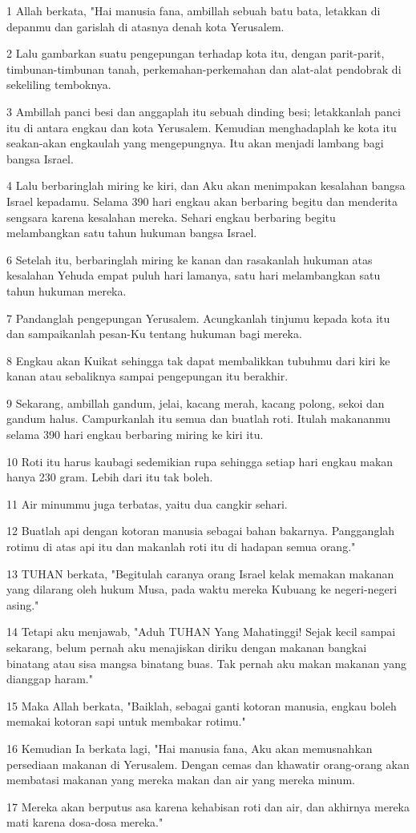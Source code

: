 \par 1 Allah berkata, "Hai manusia fana, ambillah sebuah batu bata, letakkan di depanmu dan garislah di atasnya denah kota Yerusalem.
\par 2 Lalu gambarkan suatu pengepungan terhadap kota itu, dengan parit-parit, timbunan-timbunan tanah, perkemahan-perkemahan dan alat-alat pendobrak di sekeliling temboknya.
\par 3 Ambillah panci besi dan anggaplah itu sebuah dinding besi; letakkanlah panci itu di antara engkau dan kota Yerusalem. Kemudian menghadaplah ke kota itu seakan-akan engkaulah yang mengepungnya. Itu akan menjadi lambang bagi bangsa Israel.
\par 4 Lalu berbaringlah miring ke kiri, dan Aku akan menimpakan kesalahan bangsa Israel kepadamu. Selama 390 hari engkau akan berbaring begitu dan menderita sengsara karena kesalahan mereka. Sehari engkau berbaring begitu melambangkan satu tahun hukuman bangsa Israel.
\par 6 Setelah itu, berbaringlah miring ke kanan dan rasakanlah hukuman atas kesalahan Yehuda empat puluh hari lamanya, satu hari melambangkan satu tahun hukuman mereka.
\par 7 Pandanglah pengepungan Yerusalem. Acungkanlah tinjumu kepada kota itu dan sampaikanlah pesan-Ku tentang hukuman bagi mereka.
\par 8 Engkau akan Kuikat sehingga tak dapat membalikkan tubuhmu dari kiri ke kanan atau sebaliknya sampai pengepungan itu berakhir.
\par 9 Sekarang, ambillah gandum, jelai, kacang merah, kacang polong, sekoi dan gandum halus. Campurkanlah itu semua dan buatlah roti. Itulah makananmu selama 390 hari engkau berbaring miring ke kiri itu.
\par 10 Roti itu harus kaubagi sedemikian rupa sehingga setiap hari engkau makan hanya 230 gram. Lebih dari itu tak boleh.
\par 11 Air minummu juga terbatas, yaitu dua cangkir sehari.
\par 12 Buatlah api dengan kotoran manusia sebagai bahan bakarnya. Pangganglah rotimu di atas api itu dan makanlah roti itu di hadapan semua orang."
\par 13 TUHAN berkata, "Begitulah caranya orang Israel kelak memakan makanan yang dilarang oleh hukum Musa, pada waktu mereka Kubuang ke negeri-negeri asing."
\par 14 Tetapi aku menjawab, "Aduh TUHAN Yang Mahatinggi! Sejak kecil sampai sekarang, belum pernah aku menajiskan diriku dengan makanan bangkai binatang atau sisa mangsa binatang buas. Tak pernah aku makan makanan yang dianggap haram."
\par 15 Maka Allah berkata, "Baiklah, sebagai ganti kotoran manusia, engkau boleh memakai kotoran sapi untuk membakar rotimu."
\par 16 Kemudian Ia berkata lagi, "Hai manusia fana, Aku akan memusnahkan persediaan makanan di Yerusalem. Dengan cemas dan khawatir orang-orang akan membatasi makanan yang mereka makan dan air yang mereka minum.
\par 17 Mereka akan berputus asa karena kehabisan roti dan air, dan akhirnya mereka mati karena dosa-dosa mereka."


